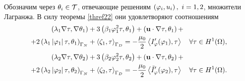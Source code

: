 Обозначим через $\theta_i \in {\mathcal{T}}$, отвечающие решениям $\left( \varphi_i, u_i \right), ~ i=1, 2$, множители Лагранжа. 
В силу теоремы \ref{thref22} они удовлетворяют соотношениям
\begin{equation}
    \label{theta1}
    \begin{split}
        \left( 
            \lambda_1 \nabla \tau, \nabla \theta_1
         \right) 
        &+ 3 \left( 
            \beta_1 \varphi_1^2 \tau, \theta_1
         \right) 
        + \left( 
            \mathbf{u} \cdot \nabla \tau, \theta_1
         \right) + \\
        + 2 \left( 
            \lambda_1 \left\vert \varphi_1 \right\vert \tau, \theta_1
         \right)_{\Gamma_N} 
        &+ \left\langle \zeta_1, \tau \right\rangle_{\Gamma_D}
        = - \frac{\mu_0}{2} \left\langle 
            I_\varphi' (\varphi_1), \tau
         \right\rangle \quad
        \forall \tau \in H^1 (\Omega),
    \end{split}
\end{equation}
\begin{equation}
    \label{theta2}
    \begin{split}
        \left( 
            \lambda_2 \nabla \tau, \nabla \theta_2
         \right) 
        &+ 3 \left( 
            \beta_2 \varphi_2^2 \tau, \theta_2
         \right) 
        + \left( 
            \mathbf{u} \cdot \nabla \tau, \theta_2
         \right) + \\
        + 2 \left( 
            \lambda_2 \left\vert \varphi_2 \right\vert \tau, \theta_2
         \right)_{\Gamma_N}
        &+ \left\langle \zeta_2, \tau \right\rangle_{\Gamma_D}
        = - \frac{\mu_0}{2} \left\langle 
            \tilde I_\varphi' (\varphi_2), \tau
         \right\rangle \quad 
        \forall \tau \in H^1 (\Omega).
    \end{split}
\end{equation}

